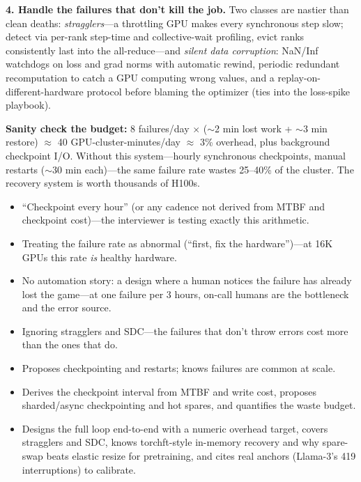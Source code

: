 \begin{interviewq}
\textbf{4. Handle the failures that don't kill the job.} Two classes are nastier than clean deaths: \emph{stragglers}---a throttling GPU makes every synchronous step slow; detect via per-rank step-time and collective-wait profiling, evict ranks consistently last into the all-reduce---and \emph{silent data corruption}: NaN/Inf watchdogs on loss and grad norms with automatic rewind, periodic redundant recomputation to catch a GPU computing wrong values, and a replay-on-different-hardware protocol before blaming the optimizer (ties into the loss-spike playbook).

\textbf{Sanity check the budget:} 8 failures/day $\times$ ($\sim$2 min lost work + $\sim$3 min restore) $\approx$ 40 GPU-cluster-minutes/day $\approx$ 3\% overhead, plus background checkpoint I/O. Without this system---hourly synchronous checkpoints, manual restarts ($\sim$30 min each)---the same failure rate wastes 25--40\% of the cluster. The recovery system is worth thousands of H100s.

\redflags
\begin{itemize}
    \item ``Checkpoint every hour'' (or any cadence not derived from MTBF and checkpoint cost)---the interviewer is testing exactly this arithmetic.
    \item Treating the failure rate as abnormal (``first, fix the hardware'')---at 16K GPUs this rate \emph{is} healthy hardware.
    \item No automation story: a design where a human notices the failure has already lost the game---at one failure per 3 hours, on-call humans are the bottleneck and the error source.
    \item Ignoring stragglers and SDC---the failures that don't throw errors cost more than the ones that do.
\end{itemize}


\goodgreat
\begin{itemize}
    \item {} Proposes checkpointing and restarts; knows failures are common at scale.
    \item {} Derives the checkpoint interval from MTBF and write cost, proposes sharded/async checkpointing and hot spares, and quantifies the waste budget.
    \item {} Designs the full loop end-to-end with a numeric overhead target, covers stragglers and SDC, knows torchft-style in-memory recovery and why spare-swap beats elastic resize for pretraining, and cites real anchors (Llama-3's 419 interruptions) to calibrate.
\end{itemize}


\end{interviewq}
